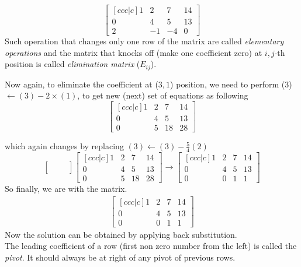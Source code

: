 \documentclass{article}
\begin{document}
\[
\begin{bmatrix}[ccc|c]
    1 & 2 & 7 & 14\\
    0 & 4 & 5 & 13 \\
    2 & -1 & -4 & 0
\end{bmatrix}
\]
Such operation that changes only one row of the matrix are called \textit{elementary operations} and the matrix that knocks off (make one coefficient zero) at $i,j$-th position is called \textit{elimination matrix} ($E_{ij}$).

Now again, to eliminate the coefficient at ($3,1$) position, we need to perform (3) $\longleftarrow (3) - 2\times (1) $, to get new (next) set of equations as following
\[
\begin{bmatrix}[ccc|c]
    1 & 2 & 7 & 14\\
    0 & 4 & 5 & 13 \\
    0 & 5 & 18 & 28
\end{bmatrix}
\]

which again changes by replacing $(3) \longleftarrow (3) - \frac{5}{4}(2) $
\[
\begin{bmatrix}
    & & \\
    & & \\
    & &
\end{bmatrix}
\begin{bmatrix}[ccc|c]
    1 & 2 & 7 & 14\\
    0 & 4 & 5 & 13 \\
    0 & 5 & 18 & 28
\end{bmatrix} \longrightarrow \begin{bmatrix}[ccc|c]
                                1 & 2 & 7 & 14\\
                                0 & 4 & 5 & 13\\
                                0 & 0 & 1 & 1
                              \end{bmatrix}
\]
So finally, we are with the matrix.\\
\begin{align}
\begin{bmatrix}[ccc|c] 
1 & 2 & 7 & 14 \\
0 & 4 & 5 & 13 \\
0 & 0 & 1 & 1
\end{bmatrix}
\end{align}\label{GE1}
Now the solution can be obtained by applying back substitution.\\

The leading coefficient of a row (first non zero number from the left) is called the \textit{pivot}. It should always be at right of any pivot of previous rows.\\
\end{document}
